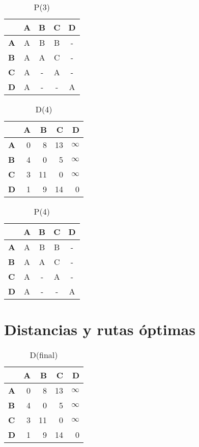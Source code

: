 \documentclass[11pt]{article}
\newcommand{\INF}{$\infty$}
\begin{document}
\begin{table}[H]\centering
\caption{P(3)}
\begin{tabular}{l c c c c}
\toprule
 & \textbf{A} & \textbf{B} & \textbf{C} & \textbf{D}\\\midrule
\textbf{A} & A & B & B & - \\
\textbf{B} & A & A & C & - \\
\textbf{C} & A & - & A & - \\
\textbf{D} & A & - & - & A \\
\bottomrule
\end{tabular}
\end{table}

\begin{table}[H]\centering
\caption{D(4)}
\begin{tabular}{l r r r r}
\toprule
 & \textbf{A} & \textbf{B} & \textbf{C} & \textbf{D}\\\midrule
\textbf{A} & 0 & 8 & 13 & \INF \\
\textbf{B} & 4 & 0 & 5 & \INF \\
\textbf{C} & 3 & 11 & 0 & \INF \\
\textbf{D} & 1 & 9 & 14 & 0 \\
\bottomrule
\end{tabular}
\end{table}

\begin{table}[H]\centering
\caption{P(4)}
\begin{tabular}{l c c c c}
\toprule
 & \textbf{A} & \textbf{B} & \textbf{C} & \textbf{D}\\\midrule
\textbf{A} & A & B & B & - \\
\textbf{B} & A & A & C & - \\
\textbf{C} & A & - & A & - \\
\textbf{D} & A & - & - & A \\
\bottomrule
\end{tabular}
\end{table}

\section*{Distancias y rutas óptimas}
\begin{table}[H]\centering
\caption{D(final)}
\begin{tabular}{l r r r r}
\toprule
 & \textbf{A} & \textbf{B} & \textbf{C} & \textbf{D}\\\midrule
\textbf{A} & 0 & 8 & 13 & \INF \\
\textbf{B} & 4 & 0 & 5 & \INF \\
\textbf{C} & 3 & 11 & 0 & \INF \\
\textbf{D} & 1 & 9 & 14 & 0 \\
\bottomrule
\end{tabular}
\end{table}
\end{document}

